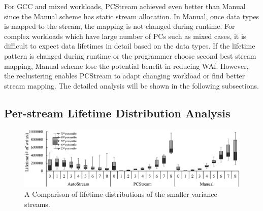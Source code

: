 For GCC and mixed workloads, PCStream achieved even better than Manual
since the Manual scheme has static stream allocation.
In Manual, once data types is mapped to the stream, the mapping is not changed 
during runtime.
For complex workloads which have large number of PCs such as mixed cases,
it is difficult to expect data lifetimes in detail based on the data types.
If the lifetime pattern is changed during runtime or the programmer choose
second best stream mapping,
Manual scheme lose the potential benefit in reducing WAf.
However, the reclustering enables PCStream to adapt changing workload or find
better stream mapping.
The detailed analysis will be shown in the following subsections.

\subsection{Per-stream Lifetime Distribution Analysis}

\begin{figure}[t]
	\centering
	\includegraphics[width=1\linewidth]{figure/distribution}
	\caption{A Comparison of lifetime distributions of the smaller variance streams.}
	\label{fig:distribution}
\end{figure}


